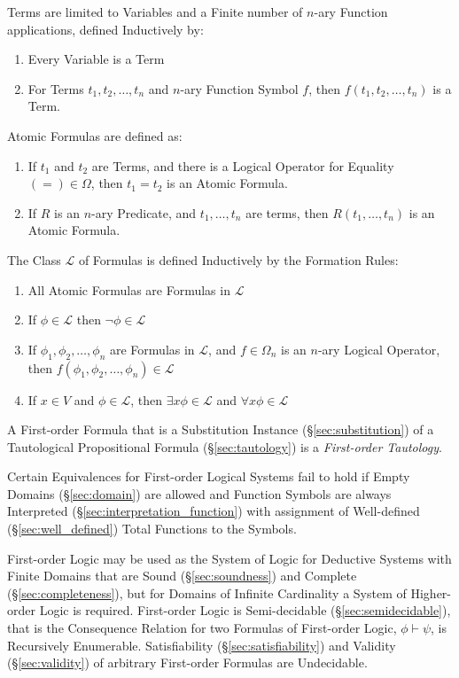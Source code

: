 Terms are limited to Variables and a Finite number of $n$-ary Function
applications, defined Inductively by:
\begin{enumerate}
  \item Every Variable is a Term
  \item For Terms $t_1, t_2, \ldots, t_n$ and $n$-ary Function Symbol
    $f$, then $f(t_1, t_2, \ldots, t_n)$ is a Term.
\end{enumerate}
Atomic Formulas are defined as:
\begin{enumerate}
  \item If $t_1$ and $t_2$ are Terms, and there is a Logical Operator
    for Equality\\$(=) \in \Omega$, then $t_1 = t_2$ is an Atomic
    Formula.
  \item If $R$ is an $n$-ary Predicate, and $t_1,\ldots,t_n$ are
    terms, then $R(t_1,\ldots,t_n)$ is an Atomic Formula.
\end{enumerate}
The Class $\mathcal{L}$ of Formulas is defined Inductively by the
Formation Rules:
\begin{enumerate}
  \item All Atomic Formulas are Formulas in $\mathcal{L}$
  \item If $\phi \in \mathcal{L}$ then $\neg \phi \in \mathcal{L}$
  \item If $\phi_1, \phi_2, \dots, \phi_n$ are Formulas in
    $\mathcal{L}$, and $f \in \Omega_n$ is an $n$-ary Logical Operator,
    then $f (\phi_1, \phi_2, \ldots, \phi_n) \in \mathcal{L}$
  \item If $x \in V$ and $\phi \in \mathcal{L}$, then $\exists x \phi
    \in \mathcal{L}$ and $\forall x \phi \in \mathcal{L}$
\end{enumerate}
A First-order Formula that is a Substitution Instance
(\S\ref{sec:substitution}) of a Tautological Propositional Formula
(\S\ref{sec:tautology}) is a \emph{First-order Tautology}.

Certain Equivalences for First-order Logical Systems fail to hold if
Empty Domains (\S\ref{sec:domain}) are allowed and Function Symbols
are always Interpreted (\S\ref{sec:interpretation_function}) with
assignment of Well-defined (\S\ref{sec:well_defined}) Total Functions
to the Symbols.

First-order Logic may be used as the System of Logic for Deductive
Systems with Finite Domains that are Sound (\S\ref{sec:soundness}) and
Complete (\S\ref{sec:completeness}), but for Domains of Infinite
Cardinality a System of Higher-order Logic is required. First-order
Logic is Semi-decidable (\S\ref{sec:semidecidable}), that is the
Consequence Relation for two Formulas of First-order Logic, $\phi
\vdash \psi$, is Recursively Enumerable. Satisfiability
(\S\ref{sec:satisfiability}) and Validity (\S\ref{sec:validity}) of
arbitrary First-order Formulas are Undecidable.

